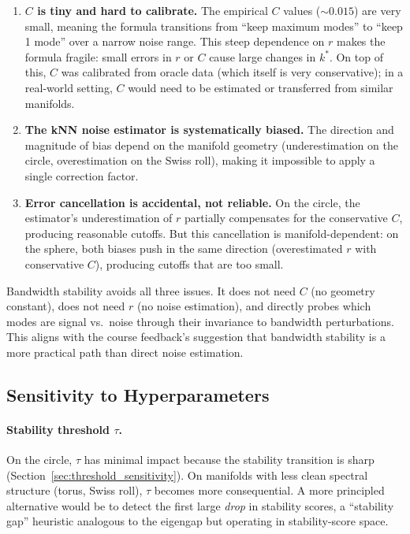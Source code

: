 \documentclass{article}
\begin{document}
\begin{enumerate}
    \item \textbf{$C$ is tiny and hard to calibrate.} The empirical $C$ values (${\sim}0.015$) are very small, meaning the formula transitions from ``keep maximum modes'' to ``keep 1 mode'' over a narrow noise range. This steep dependence on $r$ makes the formula fragile: small errors in $r$ or $C$ cause large changes in $k^*$. On top of this, $C$ was calibrated from oracle data (which itself is very conservative); in a real-world setting, $C$ would need to be estimated or transferred from similar manifolds.

    \item \textbf{The kNN noise estimator is systematically biased.} The direction and magnitude of bias depend on the manifold geometry (underestimation on the circle, overestimation on the Swiss roll), making it impossible to apply a single correction factor.

    \item \textbf{Error cancellation is accidental, not reliable.} On the circle, the estimator's underestimation of $r$ partially compensates for the conservative $C$, producing reasonable cutoffs. But this cancellation is manifold-dependent: on the sphere, both biases push in the same direction (overestimated $r$ with conservative $C$), producing cutoffs that are too small.
\end{enumerate}

Bandwidth stability avoids all three issues. It does not need $C$ (no geometry constant), does not need $r$ (no noise estimation), and directly probes which modes are signal vs.\ noise through their invariance to bandwidth perturbations. This aligns with the course feedback's suggestion that bandwidth stability is a more practical path than direct noise estimation.

\subsection{Sensitivity to Hyperparameters}

\paragraph{Stability threshold $\tau$.} On the circle, $\tau$ has minimal impact because the stability transition is sharp (Section~\ref{sec:threshold_sensitivity}). On manifolds with less clean spectral structure (torus, Swiss roll), $\tau$ becomes more consequential. A more principled alternative would be to detect the first large \emph{drop} in stability scores, a ``stability gap'' heuristic analogous to the eigengap but operating in stability-score space.
\end{document}
